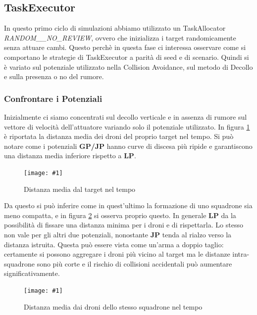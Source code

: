 \documentclass[a4paper,11pt,oneside, table]{article}
\newcommand{\putimage}[4] {
	\begin{figure}[H]
	    \centering
	    \texttt{[image: \#1]}
	    \caption{#2}\label{#3}
	\end{figure}
}
\begin{document}
\subsection{TaskExecutor}

In questo primo ciclo di simulazioni abbiamo utilizzato un TaskAllocator \textit{RANDOM\_\_NO\_REVIEW}, ovvero che inizializza i target randomicamente senza attuare cambi.
Questo perch\`e in questa fase ci interessa osservare come si comportano le strategie di TaskExecutor a parit\`a di seed e di scenario.
Quindi si \`e variato sul potenziale utilizzato nella Collision Avoidance, sul metodo di Decollo e sulla presenza o no del rumore.

\subsubsection{Confrontare i Potenziali}

Inizialmente ci siamo concentrati sul decollo verticale e in assenza di rumore sul vettore di velocit\`a dell'attuatore variando solo il potenziale utilizzato.
In figura \ref{png:task-executor-noiseless-vertical-MeanDistanceFromTarget} \`e riportata la distanza media dei droni del proprio target nel tempo. Si pu\`o notare come i potenziali \textbf{GP/JP} hanno curve di discesa pi\`u ripide e garantiscono una distanza media inferiore rispetto a \textbf{LP}.

\putimage{images/experiments/task-executor-noiseless-vertical/MeanDistanceFromTarget.png}{Distanza media dal target nel tempo}{png:task-executor-noiseless-vertical-MeanDistanceFromTarget}{0.99}

Da questo si pu\`o inferire come in quest'ultimo la formazione di uno squadrone sia meno compatta, e in figura \ref{png:task-executor-noiseless-vertical-MeanDistancesWithinSquadron} si osserva proprio questo.
In generale \textbf{LP} da la possibilit\`a di fissare una distanza minima per i droni e di rispettarla. Lo stesso non vale per gli altri due potenziali, nonostante \textbf{JP} tenda al rialzo verso la distanza istruita.
Questa pu\`o essere vista come un'arma a doppio taglio: certamente si possono aggregare i droni pi\`u vicino al target ma le distanze intra-squadrone sono pi\`u corte e il rischio di collisioni accidentali pu\`o aumentare significativamente.

\putimage{images/experiments/task-executor-noiseless-vertical/MeanDistancesWithinSquadron.png}{Distanza media dai droni dello stesso squadrone nel tempo}{png:task-executor-noiseless-vertical-MeanDistancesWithinSquadron}{0.99}
\end{document}
